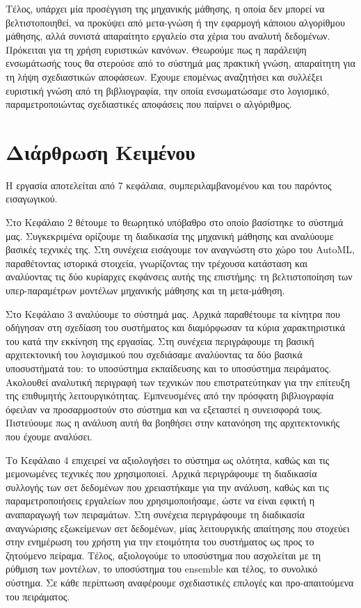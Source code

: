 Τέλος, υπάρχει μία προσέγγιση της μηχανικής μάθησης, η οποία δεν μπορεί να βελτιστοποιηθεί, να προκύψει από μετα-γνώση ή την εφαρμογή κάποιου αλγορίθμου μάθησης, αλλά συνιστά απαραίτητο εργαλείο στα χέρια του αναλυτή δεδομένων. Πρόκειται για τη χρήση ευριστικών κανόνων. Θεωρούμε πως η παράλειψη ενσωμάτωσής τους θα στερούσε από το σύστημά μας πρακτική γνώση, απαραίτητη για τη λήψη σχεδιαστικών αποφάσεων. Έχουμε επομένως αναζητήσει και συλλέξει ευριστική γνώση από τη βιβλιογραφία, την οποία ενσωματώσαμε στο λογισμικό, παραμετροποιώντας σχεδιαστικές αποφάσεις που παίρνει ο αλγόριθμος.

\section{Διάρθρωση Κειμένου} Η εργασία αποτελείται από 7 κεφάλαια, συμπεριλαμβανομένου και του παρόντος εισαγωγικού.

Στο Κεφάλαιο 2 θέτουμε το θεωρητικό υπόβαθρο στο οποίο βασίστηκε το σύστημά μας. Συγκεκριμένα ορίζουμε τη διαδικασία της μηχανική μάθησης και αναλύουμε βασικές τεχνικές της. Στη συνέχεια εισάγουμε τον αναγνώστη στο χώρο του AutoML, παραθέτοντας ιστορικά στοιχεία, γνωρίζοντας την τρέχουσα κατάσταση και αναλύοντας τις δύο κυρίαρχες εκφάνσεις αυτής της επιστήμης: τη βελτιστοποίηση των υπερ-παραμέτρων μοντέλων μηχανικής μάθησης και τη μετα-μάθηση.  

Στο Κεφάλαιο 3 αναλύουμε το σύστημά μας. Αρχικά παραθέτουμε τα κίνητρα που οδήγησαν στη σχεδίαση του συστήματος και διαμόρφωσαν τα κύρια χαρακτηριστικά του κατά την εκκίνηση της εργασίας. Στη συνέχεια περιγράφουμε τη βασική αρχιτεκτονική του λογισμικού που σχεδιάσαμε αναλύοντας τα δύο βασικά υποσυστήματά του: το υποσύστημα εκπαίδευσης και το υποσύστημα πειράματος. Ακολουθεί αναλυτική περιγραφή των τεχνικών που επιστρατεύτηκαν για την επίτευξη της επιθυμητής λειτουργικότητας. Εμπνευσμένες από την πρόσφατη βιβλιογραφία όφειλαν να προσαρμοστούν στο σύστημα και να εξεταστεί η συνεισφορά τους. Πιστεύουμε πως η ανάλυση αυτή θα βοηθήσει στην κατανόηση της αρχιτεκτονικής που έχουμε αναλύσει.

Το Κεφάλαιο 4 επιχειρεί να αξιολογήσει το σύστημα ως ολότητα, καθώς και τις μεμονωμένες τεχνικές που χρησιμοποιεί. Αρχικά περιγράφουμε τη διαδικασία συλλογής των σετ δεδομένων που χρειαστήκαμε για την ανάλυση, καθώς και τις παραμετροποιήσεις εργαλείων που χρησιμοποιήσαμε, ώστε να είναι εφικτή η αναπαραγωγή των πειραμάτων. Στη συνέχεια περιγράφουμε τη διαδικασία αναγνώρισης εξωκείμενων σετ δεδομένων, μίας λειτουργικής απαίτησης που στοχεύει στην ενημέρωση του χρήστη για την ετοιμότητα του συστήματος ως προς το ζητούμενο πείραμα. Τέλος, αξιολογούμε το υποσύστημα που ασχολείται με τη ρύθμιση των μοντέλων, το υποσύστημα του ensemble και τέλος, το συνολικό σύστημα. Σε κάθε περίπτωση αναφέρουμε σχεδιαστικές επιλογές και προ-απαιτούμενα του πειράματος.

